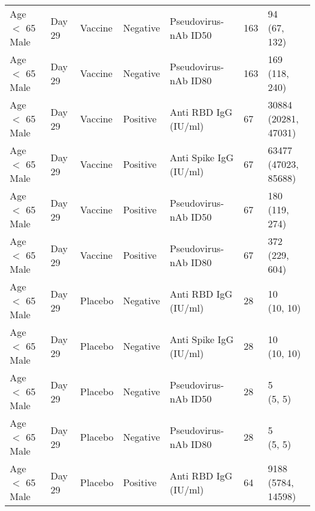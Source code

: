\documentclass[]{book}
\theoremstyle{definition}
\theoremstyle{definition}
\theoremstyle{definition}
\newcommand{\1}{\mathbbm{1}}
\begin{document}
\begin{landscape}
\begin{ThreePartTable}
\begin{longtable}[t]{>{\raggedright\arraybackslash}p{7cm}llllll}
\hspace{1em}Age $<$ 65 Male & Day 29 & Vaccine & Negative & Pseudovirus-nAb ID50 & 163 & \makecell[l]{94\\(67, 132)}\\
\hspace{1em}Age $<$ 65 Male & Day 29 & Vaccine & Negative & Pseudovirus-nAb ID80 & 163 & \makecell[l]{169\\(118, 240)}\\
\hspace{1em}Age $<$ 65 Male & Day 29 & Vaccine & Positive & Anti RBD IgG (IU/ml) & 67 & \makecell[l]{30884\\(20281, 47031)}\\
\hspace{1em}Age $<$ 65 Male & Day 29 & Vaccine & Positive & Anti Spike IgG (IU/ml) & 67 & \makecell[l]{63477\\(47023, 85688)}\\
\hspace{1em}Age $<$ 65 Male & Day 29 & Vaccine & Positive & Pseudovirus-nAb ID50 & 67 & \makecell[l]{180\\(119, 274)}\\
\hspace{1em}Age $<$ 65 Male & Day 29 & Vaccine & Positive & Pseudovirus-nAb ID80 & 67 & \makecell[l]{372\\(229, 604)}\\
\hspace{1em}Age $<$ 65 Male & Day 29 & Placebo & Negative & Anti RBD IgG (IU/ml) & 28 & \makecell[l]{10\\(10, 10)}\\
\hspace{1em}Age $<$ 65 Male & Day 29 & Placebo & Negative & Anti Spike IgG (IU/ml) & 28 & \makecell[l]{10\\(10, 10)}\\
\hspace{1em}Age $<$ 65 Male & Day 29 & Placebo & Negative & Pseudovirus-nAb ID50 & 28 & \makecell[l]{5\\(5, 5)}\\
\hspace{1em}Age $<$ 65 Male & Day 29 & Placebo & Negative & Pseudovirus-nAb ID80 & 28 & \makecell[l]{5\\(5, 5)}\\
\hspace{1em}Age $<$ 65 Male & Day 29 & Placebo & Positive & Anti RBD IgG (IU/ml) & 64 & \makecell[l]{9188\\(5784, 14598)}\\

\end{longtable}
\end{ThreePartTable}
\end{landscape}
\end{document}
